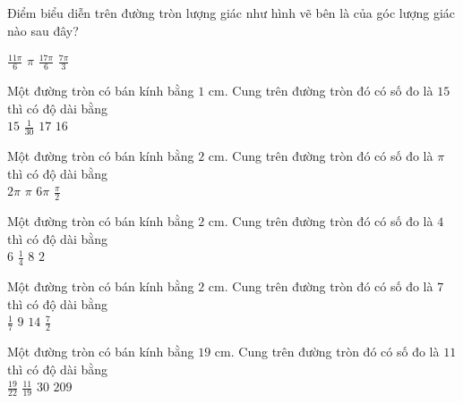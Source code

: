 \documentclass[12pt,a4paper]{article}
\begin{document}
\begin{ex}
 Điểm biểu diễn trên đường tròn lượng giác như hình vẽ bên là của  góc lượng giác nào sau đây?\\ 
\begin{center}
\end{center}
\choice
{ $\frac{11 \pi}{6}$ }
   { $\pi$ }
     { \True $\frac{17 \pi}{6}$ }
    { $\frac{7 \pi}{3}$ }
\end{ex}

\begin{ex}
 Một đường tròn có bán kính bằng ${1}$ cm. Cung trên đường tròn đó có số đo là ${15}$ thì có độ dài bằng\\ 
\choice
{ \True $15$ }
   { $\frac{1}{30}$ }
     { $17$ }
    { $16$ }
\end{ex}

\begin{ex}
 Một đường tròn có bán kính bằng ${2}$ cm. Cung trên đường tròn đó có số đo là ${\pi}$ thì có độ dài bằng\\ 
\choice
{ \True $2 \pi$ }
   { $\pi$ }
     { $6 \pi$ }
    { $\frac{\pi}{2}$ }
\end{ex}

\begin{ex}
 Một đường tròn có bán kính bằng ${2}$ cm. Cung trên đường tròn đó có số đo là ${4}$ thì có độ dài bằng\\ 
\choice
{ $6$ }
   { $\frac{1}{4}$ }
     { \True $8$ }
    { $2$ }
\end{ex}

\begin{ex}
 Một đường tròn có bán kính bằng ${2}$ cm. Cung trên đường tròn đó có số đo là ${7}$ thì có độ dài bằng\\ 
\choice
{ $\frac{1}{7}$ }
   { $9$ }
     { \True $14$ }
    { $\frac{7}{2}$ }
\end{ex}

\begin{ex}
 Một đường tròn có bán kính bằng ${19}$ cm. Cung trên đường tròn đó có số đo là ${11}$ thì có độ dài bằng\\ 
\choice
{ $\frac{19}{22}$ }
   { $\frac{11}{19}$ }
     { $30$ }
    { \True $209$ }
\end{ex}
\end{document}
